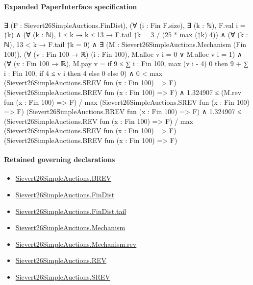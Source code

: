 \documentclass[10pt]{article}
\begin{document}
\paragraph{Expanded PaperInterface specification}
\begin{ReviewVerbatim}
∃ (F : Sievert26SimpleAuctions.FinDist),
  (∀ (i : Fin F.size), ∃ (k : ℕ), F.val i = ↑k) ∧
    (∀ (k : ℕ), 1 ≤ k → k ≤ 13 → F.tail ↑k = 3 / (25 * max (↑k) 4)) ∧
      (∀ (k : ℕ), 13 < k → F.tail ↑k = 0) ∧
        ∃ (M : Sievert26SimpleAuctions.Mechanism (Fin 100)),
          (∀ (v : Fin 100 → ℝ) (i : Fin 100), M.alloc v i = 0 ∨ M.alloc v i = 1) ∧
            (∀ (v : Fin 100 → ℝ),
                M.pay v =
                  if 9 ≤ ∑ i : Fin 100, max (v i - 4) 0 then 9 + ∑ i : Fin 100, if 4 ≤ v i then 4 else 0 else 0) ∧
              0 <
                  max (Sievert26SimpleAuctions.SREV fun (x : Fin 100) => F)
                    (Sievert26SimpleAuctions.BREV fun (x : Fin 100) => F) ∧
                1.324907 ≤
                    (M.rev fun (x : Fin 100) => F) /
                      max (Sievert26SimpleAuctions.SREV fun (x : Fin 100) => F)
                        (Sievert26SimpleAuctions.BREV fun (x : Fin 100) => F) ∧
                  1.324907 ≤
                    (Sievert26SimpleAuctions.REV fun (x : Fin 100) => F) /
                      max (Sievert26SimpleAuctions.SREV fun (x : Fin 100) => F)
                        (Sievert26SimpleAuctions.BREV fun (x : Fin 100) => F)
\end{ReviewVerbatim}

\paragraph{Retained governing declarations}
\begin{itemize}\raggedright
\item \hyperlink{paper-prerequisite-e0c4e0f254386cff}{Sievert26\allowbreak{}Simple\allowbreak{}Auctions.\allowbreak{}BREV}
\item \hyperlink{paper-prerequisite-5b39ea21863ce14e}{Sievert26\allowbreak{}Simple\allowbreak{}Auctions.\allowbreak{}Fin\allowbreak{}Dist}
\item \hyperlink{governing-declaration-b1b2d9866684404f}{Sievert26\allowbreak{}Simple\allowbreak{}Auctions.\allowbreak{}Fin\allowbreak{}Dist.\allowbreak{}tail}
\item \hyperlink{paper-prerequisite-b1d558d0810cbb0e}{Sievert26\allowbreak{}Simple\allowbreak{}Auctions.\allowbreak{}Mechanism}
\item \hyperlink{governing-declaration-8a7d9cf1128641b7}{Sievert26\allowbreak{}Simple\allowbreak{}Auctions.\allowbreak{}Mechanism.\allowbreak{}rev}
\item \hyperlink{paper-prerequisite-8bbfb5082359244f}{Sievert26\allowbreak{}Simple\allowbreak{}Auctions.\allowbreak{}REV}
\item \hyperlink{paper-prerequisite-de82ecb4c67c171b}{Sievert26\allowbreak{}Simple\allowbreak{}Auctions.\allowbreak{}SREV}
\end{itemize}
\end{document}
